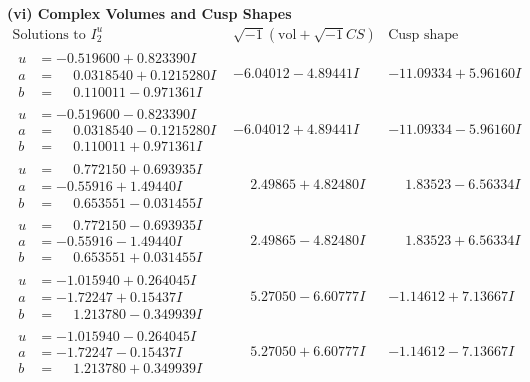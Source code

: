 \documentclass[1p]{elsarticle_modified}
\theoremstyle{definition}
\newcommand{\I}{\sqrt{-1}}
\begin{document}
\newpage\flushleft \textbf{(vi) Complex Volumes and Cusp Shapes}
$$\begin{array}{c|c|c}  
\text{Solutions to }I^u_{2}& \I (\text{vol} + \sqrt{-1}CS) & \text{Cusp shape}\\
 \hline 
\begin{aligned}
u &= -0.519600 + 0.823390 I \\
a &= \phantom{-}0.0318540 + 0.1215280 I \\
b &= \phantom{-}0.110011 - 0.971361 I\end{aligned}
 & -6.04012 - 4.89441 I & -11.09334 + 5.96160 I \\ \hline\begin{aligned}
u &= -0.519600 - 0.823390 I \\
a &= \phantom{-}0.0318540 - 0.1215280 I \\
b &= \phantom{-}0.110011 + 0.971361 I\end{aligned}
 & -6.04012 + 4.89441 I & -11.09334 - 5.96160 I \\ \hline\begin{aligned}
u &= \phantom{-}0.772150 + 0.693935 I \\
a &= -0.55916 + 1.49440 I \\
b &= \phantom{-}0.653551 - 0.031455 I\end{aligned}
 & \phantom{-}2.49865 + 4.82480 I & \phantom{-}1.83523 - 6.56334 I \\ \hline\begin{aligned}
u &= \phantom{-}0.772150 - 0.693935 I \\
a &= -0.55916 - 1.49440 I \\
b &= \phantom{-}0.653551 + 0.031455 I\end{aligned}
 & \phantom{-}2.49865 - 4.82480 I & \phantom{-}1.83523 + 6.56334 I \\ \hline\begin{aligned}
u &= -1.015940 + 0.264045 I \\
a &= -1.72247 + 0.15437 I \\
b &= \phantom{-}1.213780 - 0.349939 I\end{aligned}
 & \phantom{-}5.27050 - 6.60777 I & -1.14612 + 7.13667 I \\ \hline\begin{aligned}
u &= -1.015940 - 0.264045 I \\
a &= -1.72247 - 0.15437 I \\
b &= \phantom{-}1.213780 + 0.349939 I\end{aligned}
 & \phantom{-}5.27050 + 6.60777 I & -1.14612 - 7.13667 I \\ \hline\begin{aligned}

\end{aligned}
\end{array}$$
\end{document}
